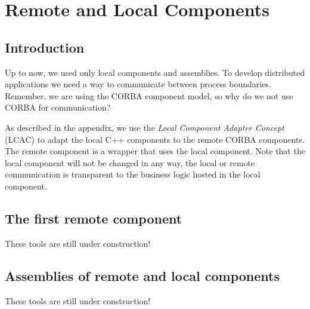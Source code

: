 \chapter{Remote and Local Components}
\begin{flushright}
{\it }
\end{flushright}

\section{Introduction}

Up to now, we used only local components and assemblies.
To develop distributed applications we need a way to communicate between 
process boundaries.
Remember, we are using the CORBA component model, so why do we not use CORBA for
communication? 

As described in the appendix, we use the {\it Local Component Adapter Concept} 
(LCAC) to adapt the local C++ components to the remote CORBA components.
The remote component is a wrapper that uses the local component.
Note that the local component will not be changed in any way, the local or
remote communication is transparent to the business logic hosted in the
local component.


\section{The first remote component}

These tools are still under construction!



\section{Assemblies of remote and local components}

These tools are still under construction!


